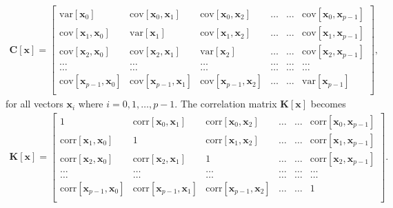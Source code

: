 \begin{align}
  \boldsymbol{C}[\boldsymbol{x}] = \begin{bmatrix}
\mathrm{var}[\boldsymbol{x}_0] & \mathrm{cov}[\boldsymbol{x}_0,\boldsymbol{x}_1]  & \mathrm{cov}[\boldsymbol{x}_0,\boldsymbol{x}_2] & \dots & \dots & \mathrm{cov}[\boldsymbol{x}_0,\boldsymbol{x}_{p-1}]\\
\mathrm{cov}[\boldsymbol{x}_1,\boldsymbol{x}_0] & \mathrm{var}[\boldsymbol{x}_1]  & \mathrm{cov}[\boldsymbol{x}_1,\boldsymbol{x}_2] & \dots & \dots & \mathrm{cov}[\boldsymbol{x}_1,\boldsymbol{x}_{p-1}]\\
\mathrm{cov}[\boldsymbol{x}_2,\boldsymbol{x}_0]   & \mathrm{cov}[\boldsymbol{x}_2,\boldsymbol{x}_1] & \mathrm{var}[\boldsymbol{x}_2] & \dots & \dots & \mathrm{cov}[\boldsymbol{x}_2,\boldsymbol{x}_{p-1}]\\
\dots & \dots & \dots & \dots & \dots & \dots \\
\dots & \dots & \dots & \dots & \dots & \dots \\
\mathrm{cov}[\boldsymbol{x}_{p-1},\boldsymbol{x}_0]   & \mathrm{cov}[\boldsymbol{x}_{p-1},\boldsymbol{x}_1] & \mathrm{cov}[\boldsymbol{x}_{p-1},\boldsymbol{x}_{2}]  & \dots & \dots  & \mathrm{var}[\boldsymbol{x}_{p-1}]\\
\end{bmatrix},
\end{align}
for all vectors $\boldsymbol{x}_i$ where $i=0,1,\dots,p-1$. The correlation matrix $\boldsymbol{K}[\boldsymbol{x}]$ becomes
\begin{align}
  \boldsymbol{K}[\boldsymbol{x}] = \begin{bmatrix}
  1 & \mathrm{corr}[\boldsymbol{x}_0,\boldsymbol{x}_1]  & \mathrm{corr}[\boldsymbol{x}_0,\boldsymbol{x}_2] & \dots & \dots & \mathrm{corr}[\boldsymbol{x}_0,\boldsymbol{x}_{p-1}]\\
  \mathrm{corr}[\boldsymbol{x}_1,\boldsymbol{x}_0] & 1  & \mathrm{corr}[\boldsymbol{x}_1,\boldsymbol{x}_2] & \dots & \dots & \mathrm{corr}[\boldsymbol{x}_1,\boldsymbol{x}_{p-1}]\\
  \mathrm{corr}[\boldsymbol{x}_2,\boldsymbol{x}_0]   & \mathrm{corr}[\boldsymbol{x}_2,\boldsymbol{x}_1] & 1 & \dots & \dots & \mathrm{corr}[\boldsymbol{x}_2,\boldsymbol{x}_{p-1}]\\
  \dots & \dots & \dots & \dots & \dots & \dots \\
  \dots & \dots & \dots & \dots & \dots & \dots \\
  \mathrm{corr}[\boldsymbol{x}_{p-1},\boldsymbol{x}_0]   & \mathrm{corr}[\boldsymbol{x}_{p-1},\boldsymbol{x}_1] & \mathrm{corr}[\boldsymbol{x}_{p-1},\boldsymbol{x}_{2}]  & \dots & \dots  & 1\\
  \end{bmatrix}.
\end{align}

